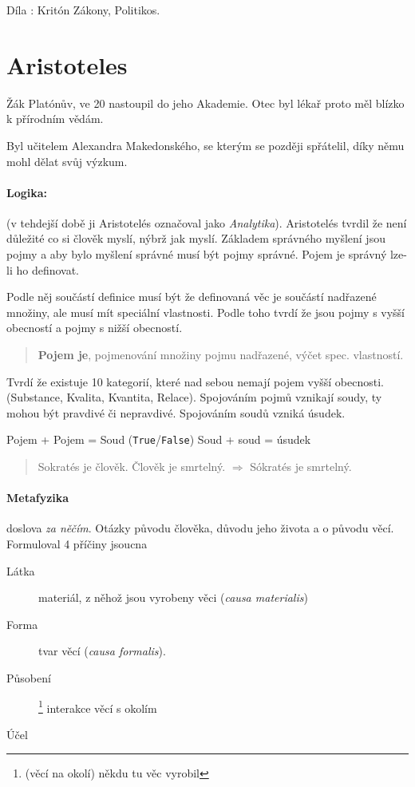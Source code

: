 \documentclass[10pt,a4paper,
twoside,%
]{report}
\begin{document}
 Díla : Kritón  Zákony, Politikos.
  
 \section{Aristoteles}

Žák Platónův, ve 20 nastoupil do jeho Akademie. Otec byl lékař proto měl blízko k přírodním vědám.

Byl učitelem Alexandra Makedonského, se kterým se později spřátelil, díky němu mohl dělat svůj výzkum.

\paragraph{Logika:}(v tehdejší době ji Aristotelés označoval jako \emph{Analytika}). Aristotelés tvrdil že není důležité co si člověk myslí, nýbrž jak myslí. Základem správného myšlení jsou pojmy a aby bylo myšlení správné musí být pojmy správné. Pojem je správný lze-li ho definovat.

Podle něj součástí definice musí být že definovaná věc je součástí nadřazené množiny, ale musí mít speciální vlastnosti. Podle toho tvrdí že jsou pojmy s vyšší obecností a pojmy s nižší obecností.

\begin{quote}
\textbf{Pojem je}, \textsf{pojmenování množiny pojmu nadřazené}, výčet spec. vlastností. 
\end{quote}


Tvrdí že existuje 10 kategorií, které nad sebou nemají pojem vyšší obecnosti. (Substance, Kvalita, Kvantita, Relace). Spojováním pojmů vznikají soudy, ty mohou být pravdivé či nepravdivé. Spojováním soudů vzniká úsudek.

\begin{center}
Pojem + Pojem = Soud (\texttt{True}/\texttt{False})
Soud + soud = úsudek
\end{center}


\begin{quote}
Sokratés je člověk. Člověk je smrtelný. $\Rightarrow$ Sókratés je smrtelný.
\end{quote}

\paragraph{Metafyzika}
doslova \emph{za něčím}. Otázky původu člověka, důvodu jeho života a o původu věcí. Formuloval 4 příčiny jsoucna 
\begin{description}
\item[Látka] materiál, z něhož jsou vyrobeny věci (\emph{causa materialis})
\item[Forma] tvar věcí (\emph{causa formalis}).
\item[Působení]\footnote{(věcí na okolí) někdu tu věc vyrobil} interakce věcí s okolím
\item[Účel] 
\end{description}
\end{document}
